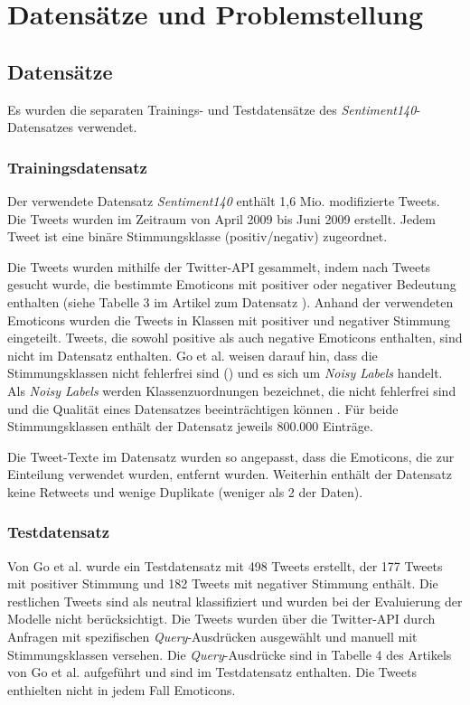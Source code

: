 \section{Datensätze und Problemstellung}\label{sec:datensätzeundproblemstellung}

\subsection{Datensätze}

Es wurden die separaten Trainings- und Testdatensätze des \textit{Sentiment140}-Datensatzes verwendet.

\subsubsection{Trainingsdatensatz}\label{subsec:trainingsdatensatz}
Der verwendete Datensatz \textit{Sentiment140} enthält 1,6 Mio. modifizierte Tweets.
Die Tweets wurden im Zeitraum von April 2009 bis Juni 2009 erstellt.
Jedem Tweet ist eine binäre Stimmungsklasse (positiv/negativ) zugeordnet.

Die Tweets wurden mithilfe der Twitter-API gesammelt, indem nach Tweets gesucht wurde, die bestimmte Emoticons mit positiver oder negativer Bedeutung enthalten (siehe Tabelle 3 im Artikel zum Datensatz \cite[S. 4]{go2009twitter}).
Anhand der verwendeten Emoticons wurden die Tweets in Klassen mit positiver und negativer Stimmung eingeteilt.
Tweets, die sowohl positive als auch negative Emoticons enthalten, sind nicht im Datensatz enthalten.
Go et al. \cite{go2009twitter} weisen darauf hin, dass die Stimmungsklassen nicht fehlerfrei sind (\cite[Abschnitt 2.2]{go2009twitter}) und es sich um \textit{Noisy Labels} handelt.
Als \textit{Noisy Labels} werden Klassenzuordnungen bezeichnet, die nicht fehlerfrei sind und die Qualität eines Datensatzes beeinträchtigen können \cite{song2022learning}.
Für beide Stimmungsklassen enthält der Datensatz jeweils 800.000 Einträge.

Die Tweet-Texte im Datensatz wurden so angepasst, dass die Emoticons, die zur Einteilung verwendet wurden, entfernt wurden.
Weiterhin enthält der Datensatz keine Retweets und wenige Duplikate (weniger als 2\textperthousand{} der Daten).

\subsubsection{Testdatensatz}\label{subsec:testdata}

Von Go et al. \cite{go2009twitter} wurde ein Testdatensatz mit 498 Tweets erstellt, der 177 Tweets mit positiver Stimmung und 182 Tweets mit negativer Stimmung enthält.
Die restlichen Tweets sind als neutral klassifiziert und wurden bei der Evaluierung der Modelle nicht berücksichtigt.
Die Tweets wurden über die Twitter-API durch Anfragen mit spezifischen \textit{Query}-Ausdrücken ausgewählt und manuell mit Stimmungsklassen versehen.
Die \textit{Query}-Ausdrücke sind in Tabelle 4 des Artikels von Go et al. \cite[S. 5]{go2009twitter} aufgeführt und sind im Testdatensatz enthalten.
Die Tweets enthielten nicht in jedem Fall Emoticons.

